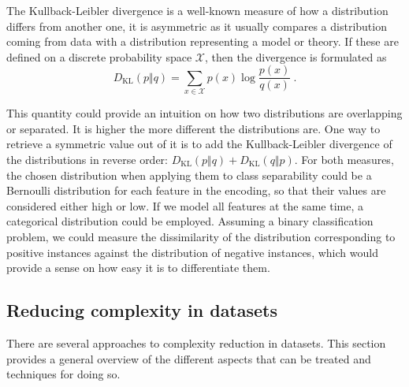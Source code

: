 The Kullback-Leibler divergence is a well-known measure of how a distribution differs from another one, it is asymmetric as it usually compares a distribution coming from data with a distribution representing a model or theory. If these are defined on a discrete probability space $\mathcal X$, then the divergence is formulated as
\begin{equation}D_{\operatorname{KL}}(p\Vert q)=\sum_{x\in\mathcal X} p(x)\log\frac{p(x)}{q(x)}~.\end{equation}

This quantity could provide an intuition on how two distributions are overlapping or separated. It is higher the more different the distributions are. One way to retrieve a symmetric value out of it is to add the Kullback-Leibler divergence of the distributions in reverse order: \(D_{\operatorname{KL}}(p\Vert q)+D_{\operatorname{KL}}(q\Vert p)\).
For both measures, the chosen distribution when applying them to class separability could be a Bernoulli distribution for each feature in the encoding, so that their values are considered either high or low. If we model all features at the same time, a categorical distribution could be employed. Assuming a binary classification problem, we could measure the dissimilarity of the distribution corresponding to positive instances against the distribution of negative instances, which would provide a sense on how easy it is to differentiate them.

\subsection{Reducing complexity in datasets}\label{p6sec.methods}

There are several approaches to complexity reduction in datasets. This section provides a general overview of the different aspects that can be treated and techniques for doing so. %



